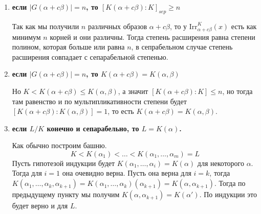 \documentclass{article}
\begin{document}
\begin{enumerate}
\begin{enumerate}
        \item \textbf{если $|G(\alpha+c\beta)|=n$, то $[K(\alpha+c\beta):K]_{sep}\geq n$}

            Так как мы получили $n$ различных образов $\alpha+c\beta$, то у
            $\text{Irr}_{\alpha+c\beta}^K(x)$ есть как минимум $n$ корней и они
            различны. Тогда степень расширения равна степени полином, которая
            больше или равна $n$, в сепрабельном случае степень расширения
            совпадает с сепарабельной степенью.

        \item \textbf{если $|G(\alpha+c\beta)|=n$, то $K(\alpha+c\beta)=K(\alpha,\beta)$}

            Но $K<K(\alpha+c\beta)\leq K(\alpha,\beta)$, а значит $[K(\alpha+c
            \beta):K]\leq n$, но тогда там равенство и по мультипликативности
            степени будет $[K(\alpha+c\beta):K(\alpha,\beta)]=1$, то есть
            $K(\alpha+c\beta)=K(\alpha,\beta)$.

        \item \textbf{если $L/K$ конечно и сепарабельно, то $L=K(\alpha)$.}

            Как обычно построим башню.
            \[ K<K(\alpha_1)<\ldots<K(\alpha_1,\ldots,\alpha_m)=L \]
            Пусть гипотезой индукции будет $K(\alpha_1,\ldots,\alpha_i)=K(\alpha)$
            для некоторого $\alpha$. Тогда для $i=1$ она очевидно верна. Пусть
            она верна для $i=k$, тогда $K(\alpha_1,\ldots,\alpha_k,\alpha_{k+1})=
            K(\alpha_1,\ldots,\alpha_k)(\alpha_{k+1})=K(\alpha, \alpha_{k+1})$.
            Тогда по предыдущему пункту мы получим $K(\alpha, \alpha_{k+1})=
            K(\alpha')$. По индукции это будет верно и для $L$.
    \end{enumerate}
\end{enumerate}
\end{document}
